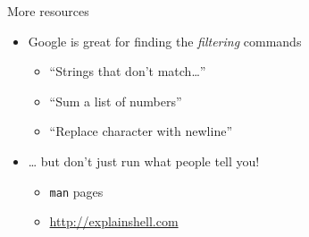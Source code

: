 \documentclass[ignorenonframetext,]{beamer}
\providecommand{\tightlist}{%
  \setlength{\itemsep}{0pt}\setlength{\parskip}{0pt}}
\begin{document}
\begin{frame}[fragile]{More resources}

\begin{itemize}
\tightlist
\item
  Google is great for finding the \emph{filtering} commands

  \begin{itemize}
  \tightlist
  \item
    ``Strings that don't match\ldots{}''
  \item
    ``Sum a list of numbers''
  \item
    ``Replace character with newline''
  \end{itemize}
\item
  \ldots{} but don't just run what people tell you!

  \begin{itemize}
  \tightlist
  \item
    \texttt{man} pages
  \item
    \url{http://explainshell.com}
  \end{itemize}
\end{itemize}

\end{frame}
\end{document}
